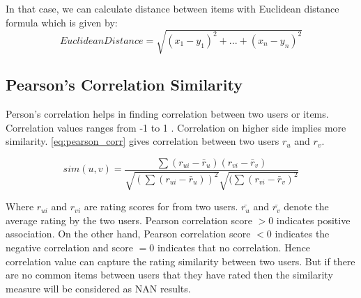 In that case, we can calculate distance between items with Euclidean distance formula which is given by:
\\
\begin{equation}
Euclidean Distance = \sqrt{(x_1 - y_1)^2 + ... + (x_n - y_n)^2}
\end{equation}


\subsection{Pearson's Correlation Similarity}
\label{pearson_correlation}
Person's correlation helps in finding correlation between two users or items. Correlation values ranges from -1 to 1 \cite{20}. Correlation on higher side implies more similarity. \autoref{eq:pearson_corr} gives correlation between two users $r_{u}$ and $r_{v}$.

\begin{equation}
sim(u,v) = \frac{\sum (r_{ui} - \bar{r}_u) (r_{vi} - \bar{r}_v )}{\sqrt{(\sum (r_{ui} - \bar{r}_u))^2} \sqrt{(\sum (r_{vi} - \bar{r}_v )^2}}
\label{eq:pearson_corr}
\end{equation}

Where $r_{ui}$ and $r_{vi}$ are rating scores for from two users. $\bar{r_{u}}$ and $\bar{r_{v}}$ denote the average rating by the two users.
Pearson correlation score $> 0$ indicates positive association. On the other hand, Pearson correlation score $ < 0$ indicates the negative correlation and score $ = 0$ indicates that no correlation. Hence correlation value can capture the rating similarity between two users. But if there are no common items between users that they have rated then the similarity measure will be considered as NAN results.
